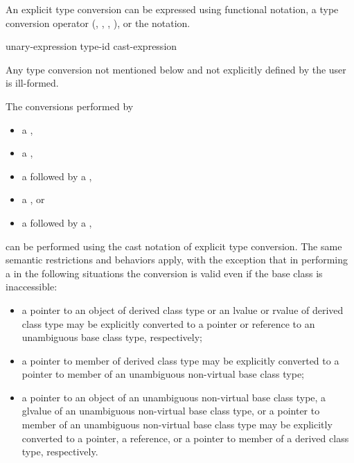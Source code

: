 \pnum
An explicit type conversion can be expressed using functional
notation, a type conversion operator
(, , ,
), or the  notation.

\begin{bnf}
\br
    unary-expression\br
    \terminal{(} type-id \terminal{)} cast-expression
\end{bnf}

\pnum
Any type conversion not mentioned below and not explicitly defined by
the user is ill-formed.

\pnum
The conversions performed by

\begin{itemize}
%
%
%
\item a ,
\item a ,
\item a  followed by a ,
\item a , or
\item a  followed by a ,
\end{itemize}

can be performed using the cast notation of explicit type conversion.
The same semantic restrictions and behaviors apply, with the exception
that in performing a  in the following situations the
conversion is valid even if the base class is inaccessible:

\begin{itemize}
\item a pointer to an object of derived class type or an lvalue or
rvalue of derived class type may be explicitly converted to a pointer or
reference to an unambiguous base class type, respectively;

\item a pointer to member of derived class type may be explicitly
converted to a pointer to member of an unambiguous non-virtual base
class type;

\item a pointer to an object of an unambiguous non-virtual base class
type, a glvalue of an unambiguous non-virtual base class type,
or a pointer to member of an unambiguous non-virtual base class type may
be explicitly converted to a pointer, a reference, or a pointer to
member of a derived class type, respectively.
\end{itemize}

